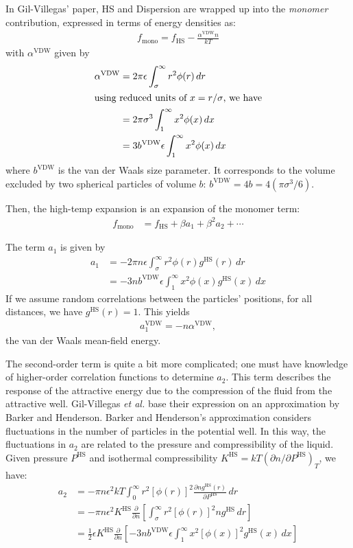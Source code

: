 \documentclass[letterpaper,twocolumn,amsmath,amssymb,pre,aps,10pt]{revtex4-1}
\begin{document}
In Gil-Villegas' paper, HS and Dispersion are wrapped up into the
\textit{monomer} contribution, expressed in terms of energy densities
as:
\begin{align}
  f_\text{mono} = f_\text{HS} - \frac{\alpha^\text{VDW}n}{kT}
\end{align}
with $\alpha^\text{VDW}$ given by
\begin{align}
  \alpha^\text{VDW} &= 2\pi\epsilon\int_\sigma^\infty r^2\phi(r)\,dr \\
  \intertext{using reduced units of $x = r/\sigma$, we have}
  &= 2\pi\sigma^3\int_1^\infty x^2\phi(x)\,dx \\
  &= 3b^\text{VDW}\epsilon\int_1^\infty x^2\phi(x)\,dx
\end{align}
where $b^\text{VDW}$ is the van der Waals size parameter. It corresponds to the volume excluded by two spherical particles of volume $b$: $b^\text{VDW} = 4b = 4\left(\pi\sigma^3/6\right)$.

Then, the high-temp expansion is an expansion of the monomer term:
\begin{align}
  f_\text{mono} &= f_\text{HS} + \beta a_1 + \beta^2 a_2 + \cdots
\end{align}

The term $a_1$ is given by
\begin{align}
  a_1 &= -2\pi n \epsilon\int_\sigma^\infty r^2\phi(r)g^\text{HS}(r)\,dr \\
  &= -3 n  b^\text{VDW}\epsilon\int_1^\infty x^2\phi(x)g^\text{HS}(x)\,dx
\end{align}
If we assume random correlations between the particles' positions, for all distances, we have $g^\text{HS}(r) = 1$. This yields
\begin{align}
  a_1^\text{VDW} = - n \alpha^\text{VDW},
\end{align}
the van der Waals mean-field energy.

The second-order term is quite a bit more complicated; one must have
knowledge of higher-order correlation functions to determine
$a_2$. This term describes the response of the attractive energy due
to the compression of the fluid from the attractive well. Gil-Villegas
\emph{et al.} base their expression on an approximation by Barker and
Henderson\cite{barker1967-SW-perturbation}. Barker and Henderson's
approximation considers fluctuations in the number of particles in the
potential well. In this way, the fluctuations in $a_2$ are related to
the pressure and compressibility of the liquid. Given pressure
$P^\text{HS}$ and isothermal compressibility $K^\text{HS} =
kT\left(\partial n  /\partial P^\text{HS}\right)_T$, we have:
\begin{align}
  a_2 &= -\pi n \epsilon^2kT\int_0^\infty r^2\left[\phi(r)\right]^2\frac{\partial n  g^\text{HS}(r)}{\partial P^\text{HS}}\,dr \\
  &= -\pi n \epsilon^2K^\text{HS}\frac{\partial}{\partial n }\left[\int_\sigma^\infty r^2\left[\phi(r)\right]^2 n  g^\text{HS}\,dr\right] \\
  &= \frac{1}{2}\epsilon K^\text{HS}\frac{\partial}{\partial n }\left[-3 n  b^\text{VDW}\epsilon\int_1^\infty x^2\left[\phi(x)\right]^2 g^\text{HS}(x)\,dx \right]
\end{align}
\end{document}
